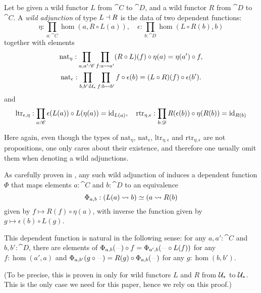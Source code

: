 \documentclass[english,a4]{article}
\def\githubpath{\tt\small}
\newcommand{\UUptd}{\UU_{\ast}}
\begin{document}
\begin{definition}
  Let be given a wild functor $L$ from $\cat C$ to $\cat D$, and a wild functor
  $R$ from $\cat D$ to $\cat C$. A \emph{wild adjunction} of type $L\dashv
  R$ is the data of two dependent functions:
  \begin{displaymath}
    \eta : \prod_{a:\cat C} \hom(a,R \circ L(a)), \quad
    \epsilon : \prod_{b:\cat D} \hom(L\circ R (b), b)
  \end{displaymath}
  together with elements
  \begin{gather*}
    \mathrm{nat}_\eta : \prod_{a,a':\cat C} \prod_{f:\hom(a,a')} (R\circ L)(f) \circ \eta(a) = \eta(a') \circ f, \\
    \mathrm{nat}_\epsilon : \prod_{b,b':\UUptd} \prod_{f:\hom(b,b')} f \circ \epsilon(b) = (L\circ R)(f) \circ \epsilon(b').
  \end{gather*}
  and
  \begin{displaymath}
    \mathrm{ltr}_{\epsilon,\eta} : \prod_{a:\mathscr{C}} \epsilon(L(a)) \circ L(\eta(a)) = \mathord{\mathrm{id}}_{L(a)}, \quad
    \mathrm{rtr}_{\eta,\epsilon} : \prod_{b:\mathscr{D}} R(\epsilon(b)) \circ \eta(R(b)) = \mathord{\mathrm{id}}_{R(b)}
  \end{displaymath}
\end{definition}
Here again, even though the types of $\mathrm{nat}_\eta$,
$\mathrm{nat}_\epsilon$, $\mathrm{ltr}_{\eta,\epsilon}$ and
$\mathrm{rtr}_{\eta,\epsilon}$ are not propositions, one only cares about their
existence, and therefore one usually omit them when denoting a wild
adjunctions.

\begin{remark} \label{def:wild-adj}
  As carefully proven in \cite[\githubpath
  theorems/homotopy/PtdAdjoint.agda]{hott-agda}, any such wild adjunction of
  induces a dependent function $\Phi$ that maps elements $a:\cat C$ and $b:\cat
  D$ to an equivalence
  \begin{displaymath}
    \Phi_{a,b} : (\hom(L(a),b)) \weq (\hom(a,R(b))
  \end{displaymath}
  given by $f \mapsto R(f) \circ \eta(a)$, with inverse the function given by
  $g\mapsto \epsilon(b) \circ L(g)$.

  This dependent function is natural in the following sense: for any $a,a':\cat
  C$ and $b,b':\cat D$, there are elements of $\Phi_{a,b}(\blank) \circ f =
  \Phi_{a',b} (\blank \circ L(f))$ for any $f:\hom(a',a)$ and
  $\Phi_{a,b'}(g\circ\blank) = R(g)\circ \Phi_{a,b} (\blank)$ for any
  $g:\hom(b,b')$. 
  
  (To be precise, this is proven in \cite{hott-agda} only for wild functors $L$
  and $R$ from $\UUptd$ to $\UUptd$. This is the only case we need for this
paper, hence we rely on this proof.)
\end{remark}
\end{document}
